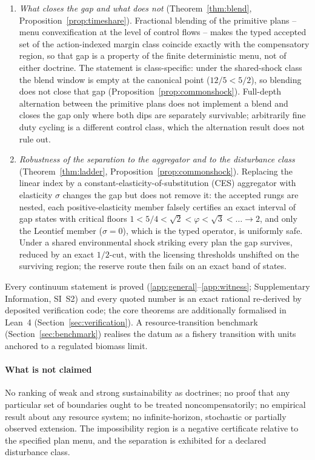 \documentclass[preprint,11pt,authoryear]{elsarticle}
\theoremstyle{definition}
\theoremstyle{remark}
\begin{document}
\begin{enumerate}[leftmargin=2em,label=(\roman*)]
\item \emph{What closes the gap and what does not} (Theorem~\ref{thm:blend}, Proposition~\ref{prop:timeshare}). Fractional blending of the primitive plans -- menu convexification at the level of control flows -- makes the typed accepted set of the action-indexed margin class coincide exactly with the compensatory region, so that gap is a property of the finite deterministic menu, not of either doctrine. The statement is class-specific: under the shared-shock class the blend window is empty at the canonical point ($12/5<5/2$), so blending does not close that gap (Proposition~\ref{prop:commonshock}). Full-depth alternation between the primitive plans does not implement a blend and closes the gap only where both dips are separately survivable; arbitrarily fine duty cycling is a different control class, which the alternation result does not rule out.
\item \emph{Robustness of the separation to the aggregator and to the disturbance class} (Theorem~\ref{thm:ladder}, Proposition~\ref{prop:commonshock}). Replacing the linear index by a constant-elasticity-of-substitution (CES) aggregator with elasticity $\sigma$ changes the gap but does not remove it: the accepted rungs are nested, each positive-elasticity member falsely certifies an exact interval of gap states with critical floors $1<5/4<\sqrt2<\varphi<\sqrt3<\dots\to2$, and only the Leontief member ($\sigma=0$), which is the typed operator, is uniformly safe. Under a shared environmental shock striking every plan the gap survives, reduced by an exact $1/2$-cut, with the licensing thresholds unshifted on the surviving region; the reserve route then fails on an exact band of states.
\end{enumerate}
Every continuum statement is proved (\ref{app:general}--\ref{app:witness}; Supplementary Information, SI~S2) and every quoted number is an exact rational re-derived by deposited verification code; the core theorems are additionally formalised in Lean~4 (Section~\ref{sec:verification}). A resource-transition benchmark (Section~\ref{sec:benchmark}) realises the datum as a fishery transition with units anchored to a regulated biomass limit.

\paragraph{What is not claimed} No ranking of weak and strong sustainability as doctrines; no proof that any particular set of boundaries ought to be treated noncompensatorily; no empirical result about any resource system; no infinite-horizon, stochastic or partially observed extension. The impossibility region is a negative certificate relative to the specified plan menu, and the separation is exhibited for a declared disturbance class.
\end{document}
